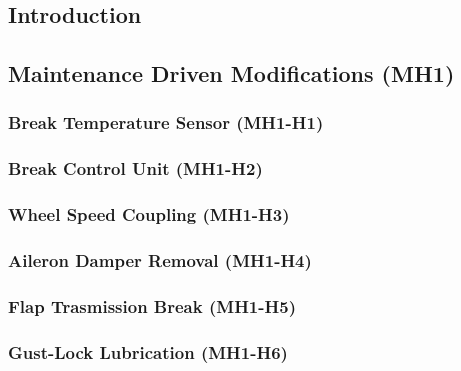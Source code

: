 ﻿%
\subsection{Introduction}
    

\subsection{Maintenance Driven Modifications (MH1)}
    \subsubsection{Break Temperature Sensor (MH1-H1)}
        
    \subsubsection{Break Control Unit (MH1-H2)}
        
    \subsubsection{Wheel Speed Coupling (MH1-H3)}
        
    \subsubsection{Aileron Damper Removal (MH1-H4)}
        
    \subsubsection{Flap Trasmission Break (MH1-H5)}
        
    \subsubsection{Gust-Lock Lubrication (MH1-H6)}
        
